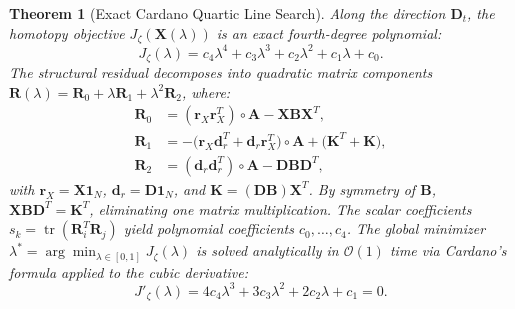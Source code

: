 \documentclass[a4paper,fleqn]{cas-dc}
\theoremstyle{thmstyleone}
\newtheorem{theorem}{Theorem}
\theoremstyle{thmstyletwo}
\theoremstyle{thmstylethree}
\begin{document}
\begin{theorem}[Exact Cardano Quartic Line Search]
\label{thm:quartic_line_search}
Along the direction $\mathbf{D}_t$, the homotopy objective $J_\zeta(\mathbf{X}(\lambda))$ is an exact fourth-degree polynomial:
\begin{equation}
J_\zeta(\lambda) = c_4 \lambda^4 + c_3 \lambda^3 + c_2 \lambda^2 + c_1 \lambda + c_0.
\label{eq:quartic}
\end{equation}
The structural residual decomposes into quadratic matrix components $\mathbf{R}(\lambda) = \mathbf{R}_0 + \lambda \mathbf{R}_1 + \lambda^2 \mathbf{R}_2$, where:
\begin{align}
\mathbf{R}_0 &= (\mathbf{r}_X \mathbf{r}_X^T) \circ \mathbf{A} - \mathbf{X}\mathbf{B}\mathbf{X}^T, \nonumber \\
\mathbf{R}_1 &= -\big(\mathbf{r}_X \mathbf{d}_r^T + \mathbf{d}_r \mathbf{r}_X^T\big) \circ \mathbf{A} + \big(\mathbf{K}^T + \mathbf{K}\big), \nonumber \\
\mathbf{R}_2 &= (\mathbf{d}_r \mathbf{d}_r^T) \circ \mathbf{A} - \mathbf{D}\mathbf{B}\mathbf{D}^T,
\end{align}
with $\mathbf{r}_X = \mathbf{X}\mathbf{1}_N$, $\mathbf{d}_r = \mathbf{D}\mathbf{1}_N$, and $\mathbf{K} = (\mathbf{D}\mathbf{B})\mathbf{X}^T$. By symmetry of $\mathbf{B}$, $\mathbf{X}\mathbf{B}\mathbf{D}^T = \mathbf{K}^T$, eliminating one matrix multiplication. The scalar coefficients $s_k = \operatorname{tr}(\mathbf{R}_i^T \mathbf{R}_j)$ yield polynomial coefficients $c_0, \dots, c_4$. The global minimizer $\lambda^* = \arg\min_{\lambda \in [0, 1]} J_\zeta(\lambda)$ is solved analytically in $\mathcal{O}(1)$ time via Cardano's formula applied to the cubic derivative:
\begin{equation}
J'_\zeta(\lambda) = 4 c_4 \lambda^3 + 3 c_3 \lambda^2 + 2 c_2 \lambda + c_1 = 0.
\label{eq:cubic_root}
\end{equation}
\end{theorem}
\end{document}
